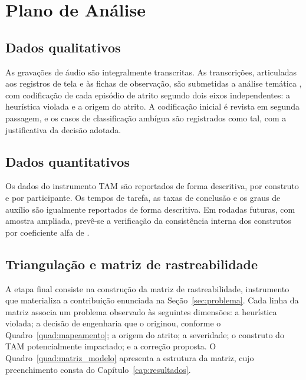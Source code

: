 \section{Plano de Análise}
\label{sec:analise}

\subsection{Dados qualitativos}

As gravações de áudio são integralmente transcritas. As transcrições, articuladas
aos registros de tela e às fichas de observação, são submetidas a análise temática
\cite{brauneclarke2006}, com codificação de cada episódio de atrito segundo dois
eixos independentes: a heurística violada e a origem do atrito. A codificação
inicial é revista em segunda passagem, e os casos de classificação ambígua são
registrados como tal, com a justificativa da decisão adotada.

\subsection{Dados quantitativos}

Os dados do instrumento TAM são reportados de forma descritiva, por construto e
por participante. Os tempos de tarefa, as taxas de conclusão e os graus de auxílio
são igualmente reportados de forma descritiva. Em rodadas futuras, com amostra
ampliada, prevê-se a verificação da consistência interna dos construtos por
coeficiente alfa de .

\subsection{Triangulação e matriz de rastreabilidade}

A etapa final consiste na construção da matriz de rastreabilidade, instrumento que
materializa a contribuição enunciada na Seção~\ref{sec:problema}. Cada linha da
matriz associa um problema observado às seguintes dimensões: a heurística violada;
a decisão de engenharia que o originou, conforme o Quadro~\ref{quad:mapeamento}; a
origem do atrito; a severidade; o construto do TAM potencialmente impactado; e a
correção proposta. O Quadro~\ref{quad:matriz_modelo} apresenta a estrutura da
matriz, cujo preenchimento consta do Capítulo~\ref{cap:resultados}.


